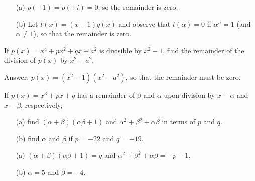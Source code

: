 \begin{solution}[name=Solution by Parviz Shahriari]
\begin{itemize}
    \item[(a)] $p(-1)=p(\pm i) = 0$, so the remainder is zero.
    \item[(b)] Let $t(x)=(x-1)q(x)$ and observe that $t(\alpha)=0$ if $\alpha^n=1$ (and $\alpha \neq 1$), so that the remainder is zero.
\end{itemize}
\end{solution}




\begin{tcolorbox}
\begin{question}
If $p(x)=x^4+px^2+qx+a^2$ is divisible by $x^2-1$, find the remainder of the division of $p(x)$ by $x^2-a^2$.
\end{question}
\end{tcolorbox}

\begin{solution}[name=Solution by Parviz Shahriari]
Answer: $p(x)=(x^2-1)(x^2-a^2)$, so that the remainder must be zero.
\end{solution}



\begin{tcolorbox}
\begin{question}
If $p(x)=x^3+px+q$ has a remainder of $\beta$ and $\alpha$ upon division by $x-\alpha$ and $x-\beta$, respectively,
\begin{itemize}
    \item[(a)] find $(\alpha+\beta)(\alpha\beta+1)$ and $\alpha^2+\beta^2+\alpha\beta$ in terms of $p$ and $q$.
    \item[(b)] find $\alpha$ and $\beta$ if $p=-22$ and $q=-19$.
\end{itemize}
\end{question}
\end{tcolorbox}

\begin{solution}[name=Solution by Parviz Shahriari]
\begin{itemize}
    \item[(a)] $(\alpha+\beta)(\alpha\beta+1)=q$ and $\alpha^2+\beta^2+\alpha\beta=-p-1$.
    \item[(b)] $\alpha=5$ and $\beta=-4$.
\end{itemize}
\end{solution}



